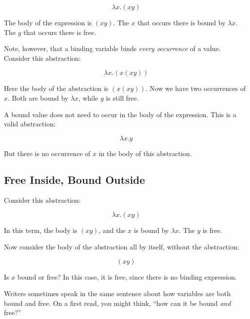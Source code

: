 \documentclass{book}
\numberwithin{equation}{chapter}
\begin{document}
\begin{equation}
\lambda x.(x y)
\end{equation}

\noindent
The body of the expression is $(x y)$. The $x$ that occurs there is bound by $\lambda x$. The $y$ that occurs there is free.

Note, however, that a binding variable binds \textit{every occurrence} of a value. Consider this abstraction:

\begin{equation}
\lambda x.(x (x y))
\end{equation}

\noindent
Here the body of the abstraction is $(x (x y))$. Now we have two occurrences of $x$. Both are bound by $\lambda x$, while $y$ is still free.

A bound value does not need to occur in the body of the expression. This is a valid abstraction:

\begin{equation}
\lambda x.y
\end{equation}

\noindent
But there is no occurrence of $x$ in the body of this abstraction.


\subsection{Free Inside, Bound Outside}

Consider this abstraction:

\begin{equation}
\lambda x.(x y)
\end{equation}

\noindent
In this term, the body is $(xy)$, and the $x$ is bound by $\lambda x$. The $y$ is free.

Now consider the body of the abstraction all by itself, without the abstraction:

\begin{equation}
(x y)
\end{equation}

\noindent
Is $x$ bound or free? In this case, it is free, since there is no binding expression.

Writers sometimes speak in the same sentence about how variables are both bound and free. On a first read, you might think, ``how can it be bound \textit{and} free?'' 
\end{document}
